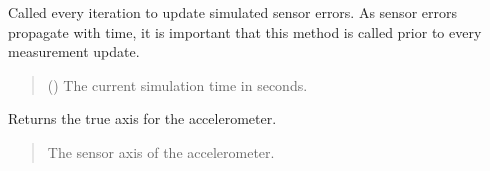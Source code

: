 \documentclass[letterpaper,10pt,english]{sphinxmanual}
\begin{document}
\begin{fulllineitems}
\begin{fulllineitems}
\label{\detokenize{modules/measurement/accelerometer:qnav.measurement.accelerometer.Accelerometer.update}}
\pysigstartsignatures
{}
\pysigstopsignatures
\sphinxAtStartPar
Called every iteration to update simulated sensor errors.
As sensor errors propagate with time, it is important that this
method is called prior to every measurement update.
\begin{quote}\begin{description}
\sphinxAtStartPar
{} () \textendash{} The current simulation time in seconds.

\end{description}\end{quote}

\end{fulllineitems}


\begin{fulllineitems}
\label{\detokenize{modules/measurement/accelerometer:qnav.measurement.accelerometer.Accelerometer.sensor_axis}}
\pysigstartsignatures
{}
\pysigstopsignatures
\sphinxAtStartPar
Returns the true axis for the accelerometer.
\begin{quote}\begin{description}
\sphinxAtStartPar
The sensor axis of the accelerometer.

\sphinxAtStartPar
{\hyperref[\detokenize{modules/measurement/platform:qnav.measurement.platform.SensorAxis}]{}}

\end{description}\end{quote}

\end{fulllineitems}


\end{fulllineitems}
\end{document}
